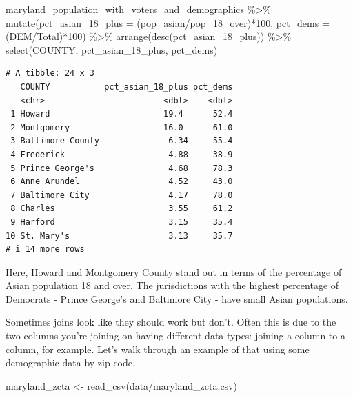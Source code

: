 \documentclass[
  letterpaper,
  DIV=11,
  numbers=noendperiod]{scrreprt}
\newenvironment{Shaded}{\begin{snugshade}}{\end{snugshade}}
\newcommand{\AttributeTok}[1]{\textcolor[rgb]{0.40,0.45,0.13}{#1}}
\newcommand{\DecValTok}[1]{\textcolor[rgb]{0.68,0.00,0.00}{#1}}
\newcommand{\FunctionTok}[1]{\textcolor[rgb]{0.28,0.35,0.67}{#1}}
\newcommand{\NormalTok}[1]{\textcolor[rgb]{0.00,0.23,0.31}{#1}}
\newcommand{\OtherTok}[1]{\textcolor[rgb]{0.00,0.23,0.31}{#1}}
\newcommand{\SpecialCharTok}[1]{\textcolor[rgb]{0.37,0.37,0.37}{#1}}
\newcommand{\StringTok}[1]{\textcolor[rgb]{0.13,0.47,0.30}{#1}}
\begin{document}
\begin{Shaded}
\begin{Highlighting}[]
\NormalTok{maryland\_population\_with\_voters\_and\_demographics }\SpecialCharTok{\%\textgreater{}\%}
  \FunctionTok{mutate}\NormalTok{(}\AttributeTok{pct\_asian\_18\_plus =}\NormalTok{ (pop\_asian}\SpecialCharTok{/}\NormalTok{pop\_18\_over)}\SpecialCharTok{*}\DecValTok{100}\NormalTok{, }\AttributeTok{pct\_dems =}\NormalTok{ (DEM}\SpecialCharTok{/}\NormalTok{Total)}\SpecialCharTok{*}\DecValTok{100}\NormalTok{) }\SpecialCharTok{\%\textgreater{}\%}
  \FunctionTok{arrange}\NormalTok{(}\FunctionTok{desc}\NormalTok{(pct\_asian\_18\_plus)) }\SpecialCharTok{\%\textgreater{}\%}
  \FunctionTok{select}\NormalTok{(COUNTY, pct\_asian\_18\_plus, pct\_dems)}
\end{Highlighting}
\end{Shaded}

\begin{verbatim}
# A tibble: 24 x 3
   COUNTY           pct_asian_18_plus pct_dems
   <chr>                        <dbl>    <dbl>
 1 Howard                       19.4      52.4
 2 Montgomery                   16.0      61.0
 3 Baltimore County              6.34     55.4
 4 Frederick                     4.88     38.9
 5 Prince George's               4.68     78.3
 6 Anne Arundel                  4.52     43.0
 7 Baltimore City                4.17     78.0
 8 Charles                       3.55     61.2
 9 Harford                       3.15     35.4
10 St. Mary's                    3.13     35.7
# i 14 more rows
\end{verbatim}

Here, Howard and Montgomery County stand out in terms of the percentage
of Asian population 18 and over. The jurisdictions with the highest
percentage of Democrats - Prince George's and Baltimore City - have
small Asian populations.

Sometimes joins look like they should work but don't. Often this is due
to the two columns you're joining on having different data types:
joining a column to a column, for example. Let's walk through an example
of that using some demographic data by zip code.

\begin{Shaded}
\begin{Highlighting}[]
\NormalTok{maryland\_zcta }\OtherTok{\textless{}{-}} \FunctionTok{read\_csv}\NormalTok{(}\StringTok{\textquotesingle{}data/maryland\_zcta.csv\textquotesingle{}}\NormalTok{)}
\end{Highlighting}
\end{Shaded}
\end{document}
